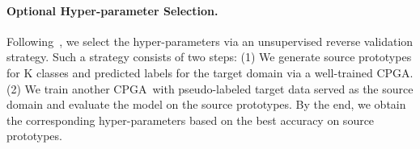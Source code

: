 \documentclass{article}
\def\eg{\emph{e.g.,~}}
\def\ournet{CPGA}
\begin{document}
\paragraph{Optional Hyper-parameter Selection.} 
Following~\cite{ganin2016domain}, we select the hyper-parameters via an unsupervised reverse validation strategy. Such a strategy consists of two steps: (1) We generate source prototypes for K classes and predicted labels for the target domain via a well-trained \ournet. (2) We train another \ournet~with pseudo-labeled target data served as the source domain and evaluate the model on the source prototypes. By the end, we obtain the corresponding hyper-parameters based on the best accuracy on source prototypes.



\begin{table*}[t]
\renewcommand\arraystretch{1.5}
    \begin{center}
    \end{center}
    \caption{\label{tab:generator}Detailed architecture of the generator, where  denote the output dimensions, \eg 2048.}
\end{table*}
\end{document}
